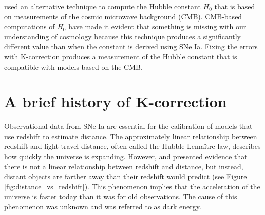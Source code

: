 \documentclass[aps,prl,reprint,amsmath,floatfix]{revtex4-2}
\begin{document}
\citet{planck2015} used an alternative technique to compute the Hubble constant
$H_0$ that is based on measurements of the cosmic microwave background (CMB).
CMB-based computations of $H_0$ have made it evident that something is missing
with our understanding of cosmology because this technique produces a
significantly different value than when the constant is derived using SNe Ia.
Fixing the errors with K-correction produces a measurement of the Hubble
constant that is compatible with models based on the CMB.

\section{A brief history of K-correction}

Observational data from SNe Ia are essential for the calibration of models that
use redshift to estimate distance. The approximately linear relationship
between redshift and light travel distance, often called the
Hubble-Lema\^{i}tre law, describes how quickly the universe is expanding.
However, \citet{riess1998} and \citet{perlmutter1999} presented evidence that
there is not a linear relationship between redshift and distance, but instead,
distant objects are farther away than their redshift would predict (see Figure
\ref{fig:distance_vs_redshift}). This phenomenon implies that the
acceleration of the universe is faster today than it was for old observations.
The cause of this phenomenon was unknown and was referred to as dark energy.
\end{document}
